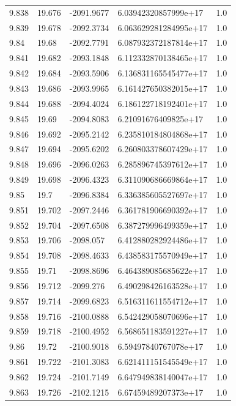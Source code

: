 \begin{tabular}{lllll}
9.838 & 19.676 & -2091.9677 & 6.03942320857999e+17 & 1.0 \\
9.839 & 19.678 & -2092.3734 & 6.063629281284995e+17 & 1.0 \\
9.84 & 19.68 & -2092.7791 & 6.087932372187814e+17 & 1.0 \\
9.841 & 19.682 & -2093.1848 & 6.112332870138465e+17 & 1.0 \\
9.842 & 19.684 & -2093.5906 & 6.136831165545477e+17 & 1.0 \\
9.843 & 19.686 & -2093.9965 & 6.161427650382015e+17 & 1.0 \\
9.844 & 19.688 & -2094.4024 & 6.186122718192401e+17 & 1.0 \\
9.845 & 19.69 & -2094.8083 & 6.21091676409825e+17 & 1.0 \\
9.846 & 19.692 & -2095.2142 & 6.235810184804868e+17 & 1.0 \\
9.847 & 19.694 & -2095.6202 & 6.260803378607429e+17 & 1.0 \\
9.848 & 19.696 & -2096.0263 & 6.285896745397612e+17 & 1.0 \\
9.849 & 19.698 & -2096.4323 & 6.311090686669864e+17 & 1.0 \\
9.85 & 19.7 & -2096.8384 & 6.336385605527697e+17 & 1.0 \\
9.851 & 19.702 & -2097.2446 & 6.361781906690392e+17 & 1.0 \\
9.852 & 19.704 & -2097.6508 & 6.387279996499359e+17 & 1.0 \\
9.853 & 19.706 & -2098.057 & 6.412880282924486e+17 & 1.0 \\
9.854 & 19.708 & -2098.4633 & 6.438583175570949e+17 & 1.0 \\
9.855 & 19.71 & -2098.8696 & 6.464389085685622e+17 & 1.0 \\
9.856 & 19.712 & -2099.276 & 6.490298426163528e+17 & 1.0 \\
9.857 & 19.714 & -2099.6823 & 6.516311611554712e+17 & 1.0 \\
9.858 & 19.716 & -2100.0888 & 6.542429058070696e+17 & 1.0 \\
9.859 & 19.718 & -2100.4952 & 6.568651183591227e+17 & 1.0 \\
9.86 & 19.72 & -2100.9018 & 6.59497840767078e+17 & 1.0 \\
9.861 & 19.722 & -2101.3083 & 6.621411151545549e+17 & 1.0 \\
9.862 & 19.724 & -2101.7149 & 6.647949838140047e+17 & 1.0 \\
9.863 & 19.726 & -2102.1215 & 6.67459489207373e+17 & 1.0 \\

\end{tabular}
